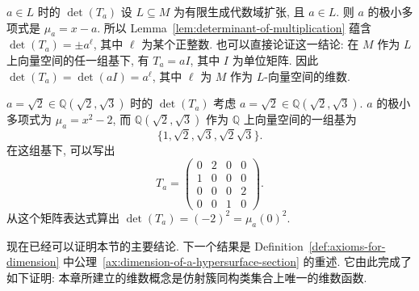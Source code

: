 \begin{Example}{$a\in L$ 时的 $\det(T_{a})$}\leavevmode\label{ex:determinant-of-multiplication-by-scalar}
设 $L\subseteq M$ 为有限生成代数域扩张, 且 $a\in L$. 则 $a$ 的极小多项式是 $\mu_{a}=x-a$. 所以 Lemma~\ref{lem:determinant-of-multiplication} 蕴含 $\det(T_{a})=\pm a^{\ell}$, 其中 $\ell$ 为某个正整数. 也可以直接论证这一结论: 在 $M$ 作为 $L$ 上向量空间的任一组基下, 有 $T_{a}=aI$, 其中 $I$ 为单位矩阵. 因此 $\det(T_{a})=\det(aI)=a^{\ell}$, 其中 $\ell$ 为 $M$ 作为 $L$-向量空间的维数.
\end{Example}

\begin{Example}{$a=\sqrt{2}\in\mathbb{Q}(\sqrt{2},\sqrt{3})$ 时的 $\det(T_{a})$}\leavevmode\label{ex:determinant-of-multiplication-by-square-root-two}
考虑 $a=\sqrt{2}\in\mathbb{Q}(\sqrt{2},\sqrt{3})$. $a$ 的极小多项式为 $\mu_{a}=x^{2}-2$, 而 $\mathbb{Q}(\sqrt{2},\sqrt{3})$ 作为 $\mathbb{Q}$ 上向量空间的一组基为
\[
  \{1,\sqrt{2},\sqrt{3},\sqrt{2}\sqrt{3}\}.
\]
在这组基下, 可以写出
\[
  T_{a}=\begin{pmatrix}
    0&2&0&0\\
    1&0&0&0\\
    0&0&0&2\\
    0&0&1&0
  \end{pmatrix}.
\]
从这个矩阵表达式算出 $\det(T_{a})=(-2)^{2}=\mu_{a}(0)^{2}$.
\end{Example}

现在已经可以证明本节的主要结论. 下一个结果是 Definition~\ref{def:axioms-for-dimension} 中公理~\ref{ax:dimension-of-a-hypersurface-section} 的重述. 它由此完成了如下证明: 本章所建立的维数概念是仿射簇同构类集合上唯一的维数函数.

